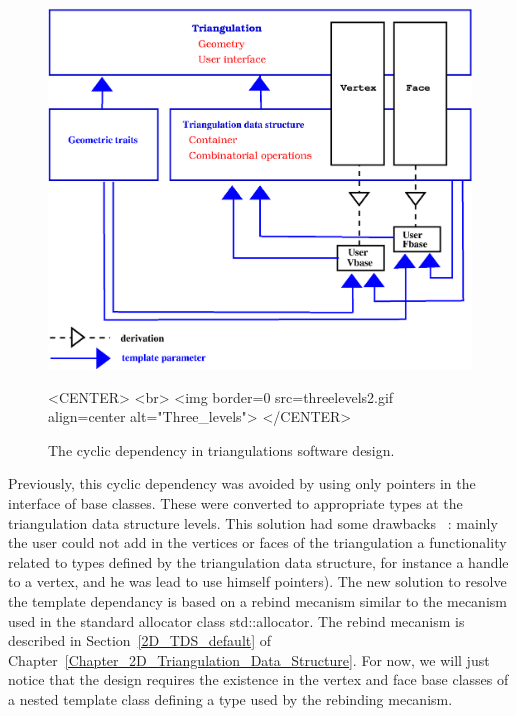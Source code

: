 \begin{figure}
\begin{ccTexOnly}
\begin{center}
\includegraphics[width=13cm]{threelevels2.eps}
\end{center}
\end{ccTexOnly}
\caption{The cyclic dependency in triangulations software design.
\label{2D_Triangulation_Fig_three_levels_2}}
\begin{ccHtmlOnly}
<CENTER>
<br>
<img border=0 src=threelevels2.gif align=center alt="Three_levels">
</CENTER>
\end{ccHtmlOnly}
\end{figure}

Previously, this cyclic dependency was avoided by 
using only  pointers in the interface of base classes.
These  were converted to appropriate types at the
triangulation data structure levels. This solution had some drawbacks
~: mainly the user could not add in the vertices or faces of the 
triangulation a functionality related to types defined by 
the triangulation data structure, for instance a handle to a vertex,
and he was lead to use himself 
  pointers).
The new solution to resolve the template dependancy
is based on a rebind mecanism similar to the mecanism used in the 
standard allocator class std::allocator. The rebind mecanism
is described in Section~\ref{2D_TDS_default} 
of Chapter~\ref{Chapter_2D_Triangulation_Data_Structure}.
For now, we will just notice that the design
requires
the existence in the vertex and face base classes 
of a nested template class
 defining a type  used by
the rebinding mecanism.


